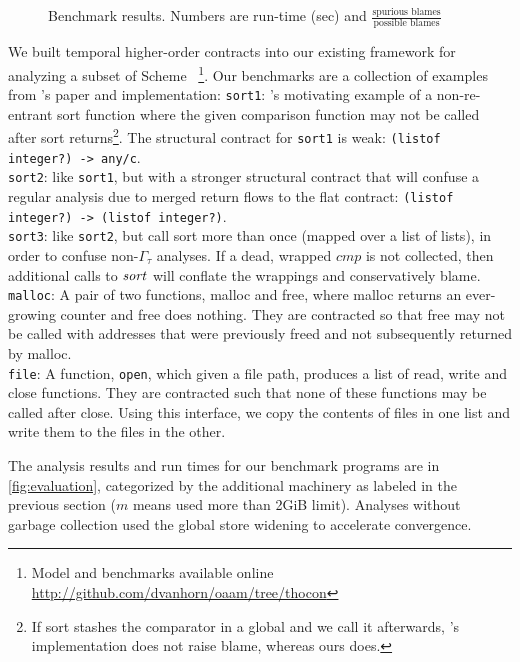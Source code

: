 \begin{figure}
  
  \caption{Benchmark results. Numbers are run-time (sec) and $\frac{\text{spurious blames}}{\text{possible blames}}$}
  \label{fig:evaluation}
\end{figure}
We built temporal higher-order contracts into our existing framework for analyzing a subset of Scheme~\citep{ianjohnson:oaam:icfp2013} \footnote{Model and benchmarks available online \url{http://github.com/dvanhorn/oaam/tree/thocon}}.
%
Our benchmarks are a collection of examples from \dfm's paper and implementation:
{\tt sort1}:{ \dfm's motivating example of a non-re-entrant sort function where the given comparison function may not be called after sort returns\footnote{If sort stashes the comparator in a global and we call it afterwards, \dfm's implementation does not raise blame, whereas ours does.}.
%
The structural contract for {\tt sort1} is weak: {\tt (listof integer?) -> any/c}.
}
\\
{\tt sort2}: like {\tt sort1}, but with a stronger structural contract that will confuse a regular analysis due to merged return flows to the flat contract: {\tt (listof integer?) -> (listof integer?)}.
\\
{\tt sort3}: like {\tt sort2}, but call sort more than once (mapped over a list of lists), in order to confuse non-$\Gamma_\tau$ analyses. If a dead, wrapped $\mathit{cmp}$ is not collected, then additional calls to $\mathit{sort}$ will conflate the wrappings and conservatively blame.
\\
{\tt malloc}: A pair of two functions, malloc and free, where malloc returns an ever-growing counter and free does nothing. They are contracted so that free may not be called with addresses that were previously freed and not subsequently returned by malloc.
\\
{\tt file}: A function, {\tt open}, which given a file path, produces a list of read, write and close functions. They are contracted such that none of these functions may be called after close. Using this interface, we copy the contents of files in one list and write them to the files in the other.

The analysis results and run times for our benchmark programs are in \autoref{fig:evaluation}, categorized by the additional machinery as labeled in the previous section ($m$ means used more than 2GiB limit).
%
Analyses without garbage collection used the global store widening to accelerate convergence.

